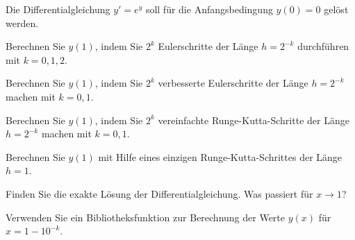 Die Differentialgleichung $y'=e^y$ soll für die Anfangsbedingung $y(0)=0$
gelöst werden.
\begin{teilaufgaben}
\item
Berechnen Sie $y(1)$, indem Sie $2^k$ Eulerschritte der Länge $h=2^{-k}$ 
durchführen mit $k=0,1,2$.
\item
Berechnen Sie $y(1)$, indem Sie $2^k$ verbesserte Eulerschritte der Länge
$h=2^{-k}$ machen mit $k=0,1$.
\item
Berechnen Sie $y(1)$, indem Sie $2^k$ vereinfachte Runge-Kutta-Schritte 
der Länge $h=2^{-k}$ machen mit $k=0,1$.
\item
Berechnen Sie $y(1)$ mit Hilfe eines einzigen Runge-Kutta-Schrittes
der Länge $h=1$.
\item
Finden Sie die exakte Lösung der Differentialgleichung.
Was passiert für $x\to 1$?
\item
Verwenden Sie ein Bibliotheksfunktion zur Berechnung der Werte $y(x)$ für
$x=1-10^{-k}$.
\end{teilaufgaben}

